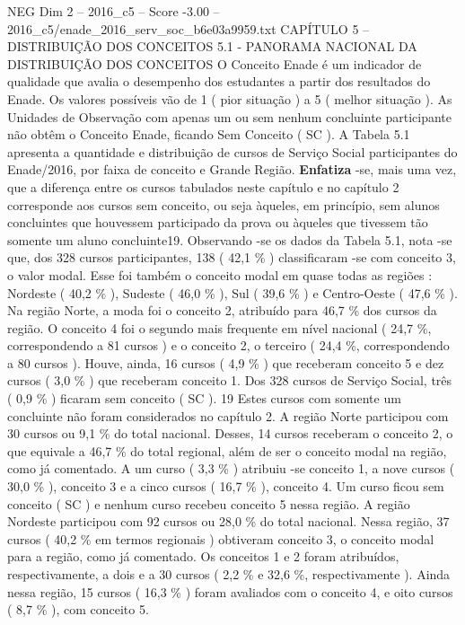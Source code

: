 \begin{textsample}{NEG Dim 2 – 2016\_c5 – Score -3.00 – 2016\_c5/enade\_2016\_serv\_soc\_b6e03a9959.txt}  \label{ex:f2_neg_032}
CAPÍTULO 5 – DISTRIBUIÇÃO DOS CONCEITOS 5.1 - PANORAMA NACIONAL DA DISTRIBUIÇÃO DOS CONCEITOS O Conceito Enade é um indicador de qualidade que avalia o desempenho dos estudantes a partir dos resultados do Enade.
Os valores possíveis vão de 1 ( pior situação ) a 5 ( melhor situação ).
As Unidades de Observação com apenas um ou sem nenhum concluinte participante não obtêm o Conceito Enade, ficando Sem Conceito ( SC ).
A Tabela 5.1 apresenta a quantidade e distribuição de cursos de Serviço Social participantes do Enade/2016, por faixa de conceito e Grande Região. \textbf{Enfatiza} -se, mais uma vez, que a diferença entre os cursos tabulados neste capítulo e no capítulo 2 corresponde aos cursos sem conceito, ou seja àqueles, em princípio, sem alunos concluintes que houvessem participado da prova ou àqueles que tivessem tão somente um aluno concluinte19.
Observando -se os dados da Tabela 5.1, nota -se que, dos 328 cursos participantes, 138 ( 42,1 \% ) classificaram -se com conceito 3, o valor modal.
Esse foi também o conceito modal em quase todas as regiões : Nordeste ( 40,2 \% ), Sudeste ( 46,0 \% ), Sul ( 39,6 \% ) e Centro-Oeste ( 47,6 \% ).
Na região Norte, a moda foi o conceito 2, atribuído para 46,7 \% dos cursos da região.
O conceito 4 foi o segundo mais frequente em nível nacional ( 24,7 \%, correspondendo a 81 cursos ) e o conceito 2, o terceiro ( 24,4 \%, correspondendo a 80 cursos ).
Houve, ainda, 16 cursos ( 4,9 \% ) que receberam conceito 5 e dez cursos ( 3,0 \% ) que receberam conceito 1.
Dos 328 cursos de Serviço Social, três ( 0,9 \% ) ficaram sem conceito ( SC ). 19 Estes cursos com somente um concluinte não foram considerados no capítulo 2.
A região Norte participou com 30 cursos ou 9,1 \% do total nacional.
Desses, 14 cursos receberam o conceito 2, o que equivale a 46,7 \% do total regional, além de ser o conceito modal na região, como já comentado.
A um curso ( 3,3 \% ) atribuiu -se conceito 1, a nove cursos ( 30,0 \% ), conceito 3 e a cinco cursos ( 16,7 \% ), conceito 4.
Um curso ficou sem conceito ( SC ) e nenhum curso recebeu conceito 5 nessa região.
A região Nordeste participou com 92 cursos ou 28,0 \% do total nacional.
Nessa região, 37 cursos ( 40,2 \% em termos regionais ) obtiveram conceito 3, o conceito modal para a região, como já comentado.
Os conceitos 1 e 2 foram atribuídos, respectivamente, a dois e a 30 cursos ( 2,2 \% e 32,6 \%, respectivamente ).
Ainda nessa região, 15 cursos ( 16,3 \% ) foram avaliados com o conceito 4, e oito cursos ( 8,7 \% ), com conceito 5.

\end{textsample}
